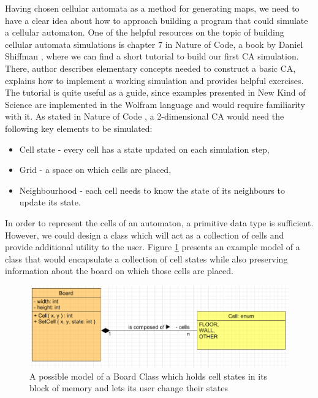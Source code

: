 \documentclass[12pt]{report}
\begin{document}
Having chosen cellular automata as a method for generating maps, we need to have a clear idea about how to approach building a program that could simulate a cellular automaton. One of the helpful resources on the topic of building cellular automata simulations is chapter 7 in Nature of Code, a book by Daniel Shiffman \autocite{shiffman2012nature}, where we can find a short tutorial to build our first CA simulation. There, author describes elementary concepts needed to construct a basic CA, explains how to implement a working simulation and provides helpful exercises. The tutorial is quite useful as a guide, since examples presented in New Kind of Science \autocite{wolfram2002new} are implemented in the Wolfram language and would require familiarity with it. As stated in Nature of Code \autocite{shiffman2012nature}, a 2-dimensional CA would need the following key elements to be simulated:

\begin{itemize}
	\item Cell state - every cell has a state updated on each simulation step,
	\item Grid - a space on which cells are placed,
	\item Neighbourhood - each cell needs to know the state of its neighbours to update its state.
\end{itemize}

In order to represent the cells of an automaton, a primitive data type is sufficient. However, we could design a class which will act as a collection of cells and provide additional utility to the user. Figure \ref{fig:boardcell} presents an example model of a class that would encapsulate a collection of cell states while also preserving information about the board on which those cells are placed. 

\begin{figure}[h]
	\centering
	\includegraphics[width=0.8\linewidth]{diagrams/boardcell01}
	\caption{ A possible model of a Board Class which holds cell states in its block of memory and lets its user change their states} 
	\label{fig:boardcell}
\end{figure}
\end{document}
